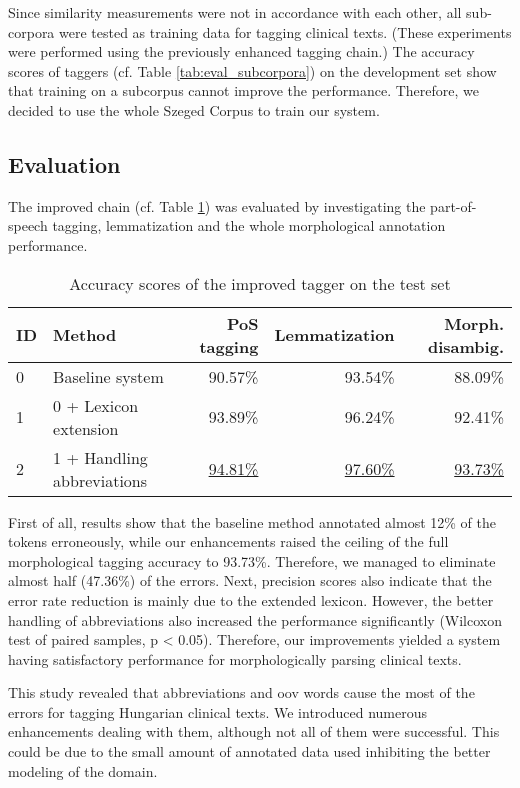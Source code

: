 Since similarity measurements were not in accordance with each other, all sub-corpora were tested as training data for tagging clinical texts. 
(These experiments were performed using the previously enhanced tagging chain.)
The accuracy scores of taggers (cf. Table  \ref{tab:eval_subcorpora}) on the development set show that training on a subcorpus cannot improve the performance. 
Therefore, we decided to use the whole Szeged Corpus to train our system.

\subsection{Evaluation}

The improved chain (cf. Table \ref{tab:improvements}) was evaluated by investigating the part-of-speech tagging, lemmatization and the whole morphological annotation performance.

\begin{table}[H]
\centering
\caption{Accuracy scores of the improved tagger on the test set}
\label{tab:improvements}
\begin{tabular}{ l l r r r} 
\hline
ID & Method & PoS tagging & Lemmatization & Morph. disambig. \\
\hline
0 & Baseline system & 90.57\% & 93.54\% & 88.09\% \\
1 & 0 + Lexicon extension & 93.89\% & 96.24\% & 92.41\% \\
2 & 1 + Handling abbreviations & \underline{94.81\%} & \underline{97.60\%} & \underline{93.73\%} \\
\hline
\end{tabular}
\end{table}

First of all, results show that the baseline method annotated almost 12\% of the tokens erroneously, while our enhancements raised the ceiling of the full morphological tagging accuracy to 93.73\%.
Therefore, we managed to eliminate almost half (47.36\%) of the errors. 
Next, precision scores also indicate that the error rate reduction is mainly due to the extended lexicon.
However, the better handling of abbreviations also increased the performance significantly (Wilcoxon test of paired samples, p < 0.05).
Therefore, our improvements yielded a system having satisfactory performance for morphologically parsing clinical texts.


This study revealed that abbreviations and \acrlong{oov} words cause the most of the errors for tagging Hungarian clinical texts.
We introduced numerous enhancements dealing with them, although not all of them were successful.
This could be due to the small amount of annotated data used inhibiting the better modeling of the domain.
